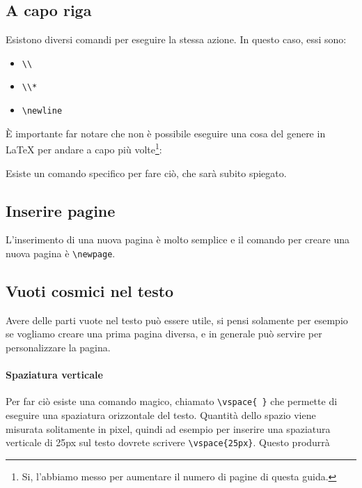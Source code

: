\subsection{A capo riga}

Esistono diversi comandi per eseguire la stessa azione. In questo caso, essi 
sono:
\begin{itemize}
 \item \verb!\\!
 \item \verb!\\*!
 \item \verb!\newline!
\end{itemize}

È importante far notare che non è possibile eseguire una cosa del genere in 
\LaTeX{} per andare a capo più volte\footnote{Si, l'abbiamo messo per 
aumentare il numero di pagine di questa guida.}:



Esiste un comando specifico per fare ciò, che sarà subito spiegato.

\subsection{Inserire pagine}

L'inserimento di una nuova pagina è molto semplice e il comando per creare una 
nuova pagina è \verb!\newpage!.

\subsection{Vuoti cosmici nel testo}

Avere delle parti vuote nel testo può essere utile, si pensi solamente per 
esempio se vogliamo creare una prima pagina diversa, e in generale può servire 
per personalizzare la pagina.

\paragraph*{Spaziatura verticale} Per far ciò esiste una comando magico, 
chiamato \verb!\vspace{ }! che permette di eseguire una spaziatura orizzontale 
del testo. Quantità dello spazio viene misurata solitamente in pixel, quindi ad 
esempio per inserire una spaziatura verticale di 25px sul testo dovrete 
scrivere \verb!\vspace{25px}!. Questo produrrà

